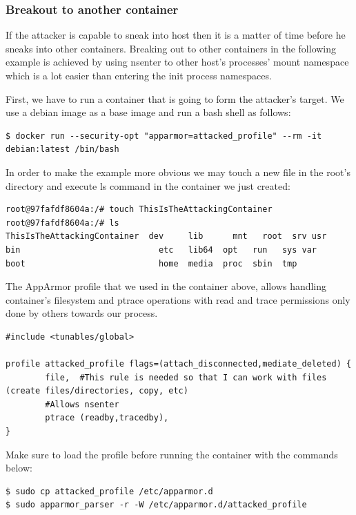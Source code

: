 \subsubsection{Breakout to another container}

If the attacker is capable to sneak into host then it is a matter of time before he sneaks into other containers. Breaking out to other containers in the following example is achieved by using nsenter to other host's processes' mount namespace which is a lot easier than entering the init process namespaces.

First, we have to run a container that is going to form the attacker's target.
We use a debian image as a base image and run a bash shell as follows:

\begin{lstlisting}[style=dockercommands]
$ docker run --security-opt "apparmor=attacked_profile" --rm -it debian:latest /bin/bash
\end{lstlisting}

In order to make the example more obvious we may touch a new file in the root's directory and execute ls command in the container we just created:

\begin{lstlisting}[style=terminal]
root@97fafdf8604a:/# touch ThisIsTheAttackingContainer
root@97fafdf8604a:/# ls
ThisIsTheAttackingContainer  dev     lib	  mnt   root  srv usr
bin                            etc   lib64  opt   run   sys var
boot                           home  media  proc  sbin  tmp
\end{lstlisting}

The AppArmor profile that we used in the container above, allows handling container's filesystem and ptrace operations with read and trace permissions only done by others towards our process.

\begin{lstlisting}[style=Dockerfile, caption={AppArmor profile attacked\_profile}]
#include <tunables/global>

profile attacked_profile flags=(attach_disconnected,mediate_deleted) {
        file,  #This rule is needed so that I can work with files (create files/directories, copy, etc)
        #Allows nsenter
        ptrace (readby,tracedby),
}
\end{lstlisting}

Make sure to load the profile before running the container with the commands below:

\begin{lstlisting}[style=terminal]
$ sudo cp attacked_profile /etc/apparmor.d
$ sudo apparmor_parser -r -W /etc/apparmor.d/attacked_profile
\end{lstlisting}

